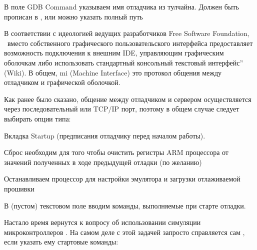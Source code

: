 \bigskip
В поле GDB Command указываем имя отладчика из тулчайна.
Должен быть прописан в , или можно указать полный путь


В соответствии с идеологией ведущих разработчиков Free Software Foundation,
\gdb\ вместо собственного графического пользовательского интерфейса
предоставляет возможность подключения к внешним IDE, управляющим графическим
оболочкам либо использовать стандартный консольный текстовый интерфейс” (Wiki).
В общем, mi (Machine Interface) это протокол общения между отладчиком и
графической оболочкой.



Как ранее было сказано, общение между отладчиком и сервером осуществляется через
последовательный или TCP/IP порт, поэтому в общем случае следует выбирать опции
типа:







\bigskip


\bigskip
Вкладка Startup (предписания отладчику перед началом работы).

\bigskip
Сброс необходим для того чтобы очистить регистры ARM процессора от значений
полученных в ходе предыдущей отладки (по желанию)


Останавливаем процессор для настройки эмулятора и загрузки отлаживаемой прошивки


В (пустом) текстовом поле вводим команды, выполняемые при старте отладки.

\bigskip
Настало время вернутся к вопросу об использовании симуляции микроконтроллеров
. На самом деле с этой задачей запросто справляется сам \gdb,
если указать ему стартовые команды:

